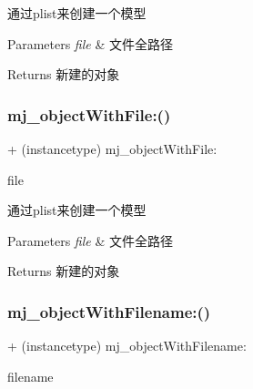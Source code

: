 通过plist来创建一个模型 
\begin{DoxyParams}{Parameters}
{\em file} & 文件全路径 \\
\hline
\end{DoxyParams}
\begin{DoxyReturn}{Returns}
新建的对象 
\end{DoxyReturn}
\mbox{\label{category_n_s_object_07_m_j_key_value_08_a98ff8a880e1de766fe702c800c1ec70d}} 
\subsubsection{\texorpdfstring{mj\+\_\+object\+With\+File\+:()}{mj\_objectWithFile:()}\hspace{0.1cm}{\footnotesize\ttfamily [3/3]}}
{\footnotesize\ttfamily + (instancetype) mj\+\_\+object\+With\+File\+: \begin{DoxyParamCaption}\item[{(N\+S\+String $\ast$)}]{file }\end{DoxyParamCaption}}

通过plist来创建一个模型 
\begin{DoxyParams}{Parameters}
{\em file} & 文件全路径 \\
\hline
\end{DoxyParams}
\begin{DoxyReturn}{Returns}
新建的对象 
\end{DoxyReturn}
\mbox{\label{category_n_s_object_07_m_j_key_value_08_a44d9d52cc68ef8c354e28ddc5973aecb}} 
\subsubsection{\texorpdfstring{mj\+\_\+object\+With\+Filename\+:()}{mj\_objectWithFilename:()}\hspace{0.1cm}{\footnotesize\ttfamily [1/3]}}
{\footnotesize\ttfamily + (instancetype) mj\+\_\+object\+With\+Filename\+: \begin{DoxyParamCaption}\item[{(N\+S\+String $\ast$)}]{filename }\end{DoxyParamCaption}}

